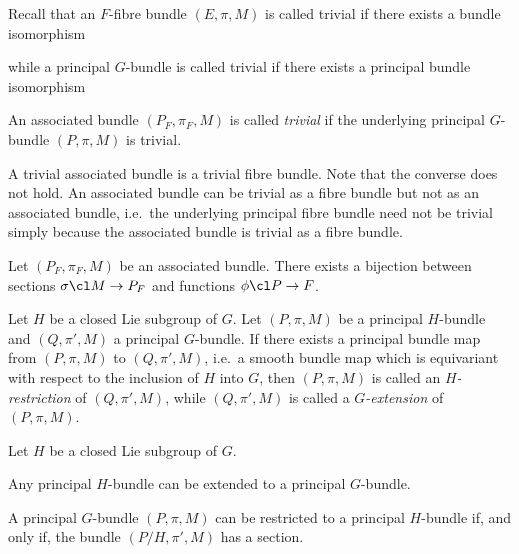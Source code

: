 \noindent Recall that an $F$-fibre bundle $(E,\pi,M)$ is called trivial if there exists a bundle isomorphism
\bse
{}
\ese
while a principal $G$-bundle is called trivial if there exists a principal bundle isomorphism
\bse
{}
\ese

\bd
An associated bundle $(P_F,\pi_F,M)$ is called \emph{trivial} if the underlying principal $G$-bundle $(P,\pi,M)$ is trivial.
\ed

\bp
A trivial associated bundle is a trivial fibre bundle.
\ep
Note that the converse does not hold. An associated bundle can be trivial as a fibre bundle but not as an associated bundle, i.e.\ the underlying principal fibre bundle need not be trivial simply because the associated bundle is trivial as a fibre bundle.

\bt
Let $(P_F,\pi_F,M)$ be an associated bundle. There exists a bijection between sections $\sigma\cl M \to P_F$ and functions $\phi\cl P\to F$. 
\et

\bd
Let $H$ be a closed Lie subgroup of $G$. Let $(P,\pi,M)$ be a principal $H$-bundle and $(Q,\pi',M)$ a principal $G$-bundle. If there exists a principal bundle map from $(P,\pi,M)$ to $(Q,\pi',M)$, i.e.\ a smooth bundle map which is equivariant with respect to the inclusion of $H$ into $G$, then $(P,\pi,M)$ is called an \emph{$H$-restriction} of $(Q,\pi',M)$, while $(Q,\pi',M)$ is called a \emph{$G$-extension} of $(P,\pi,M)$.  
\ed

\bt
Let $H$ be a closed Lie subgroup of $G$.
\ben[label=\roman*)]
\item Any principal $H$-bundle can be extended to a principal $G$-bundle.
\item A principal $G$-bundle $(P,\pi,M)$ can be restricted to a principal $H$-bundle if, and only if, the bundle $(P/H,\pi',M)$ has a section.
\een
\et

